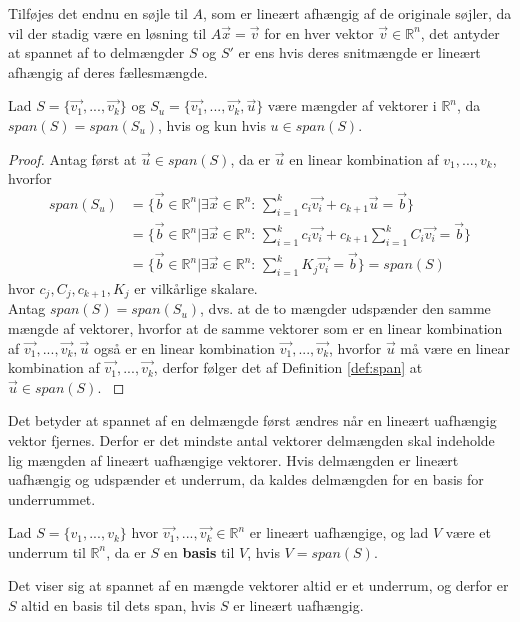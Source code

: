 Tilføjes det endnu en søjle til $A$, som er lineært afhængig af de originale søjler, da vil der stadig være en løsning til $A \vec{x} = \vec{v}$ for en hver vektor $\vec{v} \in \mathds{R}^n$, det antyder at spannet af to delmængder $S$ og $S'$ er ens hvis deres snitmængde er lineært afhængig af deres fællesmængde.
\begin{stn}
Lad $S = \{\vec{v_1},...,\vec{v_k}\}$ og $S_u = \{\vec{v_1},...,\vec{v_k}, \vec{u}\}$ være mængder af vektorer i $\mathds{R}^n$, da $span(S) = span(S_u)$, hvis og kun hvis $u \in span(S)$.
\end{stn}
\begin{proof}
Antag først at $\vec{u} \in span(S)$, da er $\vec{u}$ en linear kombination af $v_1,..., v_k$, hvorfor
\begin{align*}
span(S_u) &= \{ \vec{b} \in \mathds{R}^n| \exists \vec{x} \in \mathds{R}^n: \, \sum_{i=1}^k c_i \vec{v_i} + c_{k+1} \vec{u}  =\vec{b}\}
\\&= \{ \vec{b} \in \mathds{R}^n| \exists \vec{x} \in \mathds{R}^n: \, \sum_{i=1}^k c_i \vec{v_i} + c_{k+1} \sum_{i=1}^k C_i \vec{v_i} = \vec{b}\}
\\&= \{ \vec{b} \in \mathds{R}^n| \exists \vec{x} \in \mathds{R}^n: \, \sum_{i=1}^k K_j \vec{v_i} = \vec{b}\} = span(S)
\end{align*}
hvor $c_j, C_j, c_{k+1}, K_j$ er vilkårlige skalare.
\\ Antag $span(S) = span(S_u)$, dvs. at de to mængder udspænder den samme mængde af vektorer, hvorfor at de samme vektorer som er en linear kombination af $\vec{v_1},...,\vec{v_k}, \vec{u}$ også er en linear kombination $\vec{v_1},..., \vec{v_k}$, hvorfor $\vec{u}$ må være en linear kombination af  $\vec{v_1},..., \vec{v_k}$, derfor følger det af Definition \ref{def:span} at $\vec{u} \in span(S).$
\label{stn:akvivalentespan}
\end{proof}
Det betyder at spannet af en delmængde først ændres når en lineært uafhængig vektor fjernes. 
Derfor er det mindste antal vektorer delmængden skal indeholde lig mængden af lineært uafhængige vektorer.
Hvis delmængden er lineært uafhængig og udspænder et underrum, da kaldes delmængden for en basis for underrummet.
\begin{defn}[Basis]
Lad $S =\{v_1,...,v_k\}$ hvor $\vec{v_1},...,\vec{v_k} \in \mathds{R}^n$ er lineært uafhængige, og lad $V$ være et underrum til $\mathds{R}^n$, da er $S$ en \textbf{basis} til $V$, hvis $V = span(S)$.
\label{def:basis}
\end{defn}
Det viser sig at spannet af en mængde vektorer altid er et underrum, og derfor er $S$ altid en basis til dets span, hvis $S$ er lineært uafhængig.
